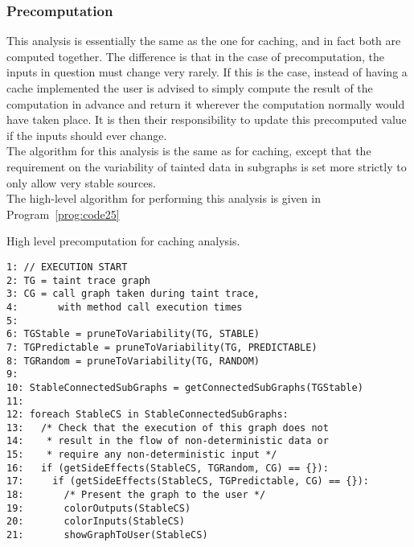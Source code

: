 \documentclass[msc,oneside]{ubcthesis}
\begin{document}
\subsubsection{Precomputation}
This analysis is essentially the same as the one for caching, and in fact both are computed together. The difference is that in the case of precomputation, the inputs in question must change very rarely. If this is the case, instead of having a cache implemented the user is advised to simply compute the result of the computation in advance and return it wherever the computation normally would have taken place. It is then their responsibility to update this precomputed value if the inputs should ever change.\\

The algorithm for this analysis is the same as for caching, except that the requirement on the variability of tainted data in subgraphs is set more strictly to only allow very stable sources.\\

The high-level algorithm for performing this analysis is given in Program~\ref{prog:code25}

\begin{Program}
  \caption{\label{prog:code25} High level precomputation for caching analysis.}
\begin{verbatim}
1: // EXECUTION START
2: TG = taint trace graph
3: CG = call graph taken during taint trace, 
4:       with method call execution times
5:    
6: TGStable = pruneToVariability(TG, STABLE)
7: TGPredictable = pruneToVariability(TG, PREDICTABLE)
8: TGRandom = pruneToVariability(TG, RANDOM)
9: 
10: StableConnectedSubGraphs = getConnectedSubGraphs(TGStable)
11: 
12: foreach StableCS in StableConnectedSubGraphs:
13:   /* Check that the execution of this graph does not 
14:    * result in the flow of non-deterministic data or 
15:    * require any non-deterministic input */
16:   if (getSideEffects(StableCS, TGRandom, CG) == {}):
17:     if (getSideEffects(StableCS, TGPredictable, CG) == {}):
18:       /* Present the graph to the user */
19:       colorOutputs(StableCS)
20:       colorInputs(StableCS)
21:       showGraphToUser(StableCS)
\end{verbatim}
\end{Program}
\end{document}
